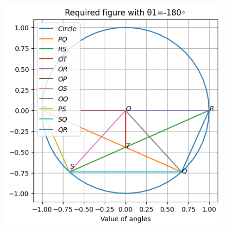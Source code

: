 \documentclass[12pt]{article}
\begin{document}
  

\begin{figure}[H]                             
	\centering
	\includegraphics[width=\columnwidth]{fig/9.10.4.3.png}                            
	\caption{}                              
	\label{fig:9.10.4.3}
\end{figure}
\end{document}

